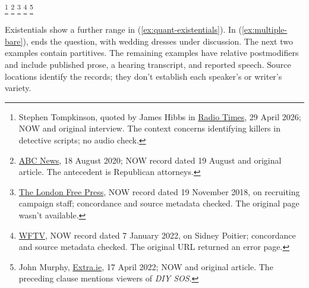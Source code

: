 \documentclass[12pt]{article}
\begin{document}
\ea\label{ex:quant-more-arguments}
\ea\label{ex:various-arg-rel} \footnote{Stephen Tompkinson, quoted by James Hibbs in \href{https://www.radiotimes.com/tv/drama/stephen-tompkinson-new-detective-role-exclusive-newsupdate/}{Radio Times}, 29 April 2026; NOW and original interview. The context concerns identifying killers in detective scripts; no audio check.}
\ex\label{ex:numerous-arg-rel} \footnote{\href{https://abcnews.com/Politics/reversal-postmaster-general-dejoy-suspends-mail-handling-election/story?id=72446764}{ABC News}, 18 August 2020; NOW record dated 19 August and original article. The antecedent is Republican attorneys.}
\ex\label{ex:multiple-arg-rel} \footnote{\href{https://lfpress.com/pmn/news-pmn/2020-democratic-contenders-already-eyeing-top-staff-in-iowa/wcm/e9a17ae7-bcb2-420c-9141-442306ec38e4}{The London Free Press}, NOW record dated 19 November 2018, on recruiting campaign staff; concordance and source metadata checked. The original page wasn't available.}
\ex\label{ex:countless-arg-rel} \footnote{\href{https://www.wftv.com/entertainment/sidney-poitier/VYJKDUZBWNMX4M5UU4NM3RT52Y/}{WFTV}, NOW record dated 7 January 2022, on Sidney Poitier; concordance and source metadata checked. The original URL returned an error page.}
\ex\label{ex:countless-subj} \footnote{John Murphy, \href{https://extra.ie/2022/04/17/entertainment/movies-tv/i-bow-to-you-diy-sos-viewers-in-total-agreement-after-latest-inspirational-episode}{Extra.ie}, 17 April 2022; NOW and original article. The preceding clause mentions viewers of \textit{DIY SOS}.}
\z\z

Existentials show a further range in (\ref{ex:quant-existentials}). In (\ref{ex:multiple-bare}),  ends the question, with wedding dresses under discussion. The next two examples contain partitives. The remaining examples have relative postmodifiers and include published prose, a hearing transcript, and reported speech. Source locations identify the records; they don't establish each speaker's or writer's variety.
\end{document}
